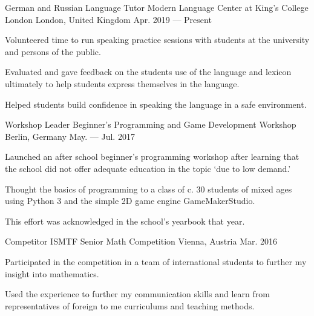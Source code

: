 \begin{cventries}
  \cventry
  {German and Russian Language Tutor} %
  {Modern Language Center at King’s College London} %
  {London, United Kingdom} %
  {Apr. 2019 --- Present} %
  {
    \begin{cvitems} %
      \item {Volunteered time to run speaking practice sessions with students at the university and persons of the public.}
      \item {Evaluated and gave feedback on the students use of the language and lexicon ultimately to help students express themselves in the language.}
      \item {Helped students build confidence in speaking the language in a safe environment.}
    \end{cvitems}
  }

  \cventry
  {Workshop Leader} %
  {Beginner's Programming and Game Development Workshop} %
  {Berlin, Germany} %
  {May. --- Jul. 2017} %
  {
    \begin{cvitems} %
      \item {Launched an after school beginner’s programming workshop after learning that the school did not offer adequate education in the topic `due to low demand.'}
      \item {Thought the basics of programming to a class of c. 30 students of mixed ages using Python 3 and the simple 2D game engine GameMakerStudio.}
      \item {This effort was acknowledged in the school’s yearbook that year.}
    \end{cvitems}
  }

  \cventry
  {Competitor} %
  {ISMTF Senior Math Competition} %
  {Vienna, Austria} %
  {Mar. 2016} %
  {
    \begin{cvitems} %
      \item {Participated in the competition in a team of international students to further my insight into mathematics.}
      \item {Used the experience to further my communication skills and learn from representatives of foreign to me curriculums and teaching methods.}
    \end{cvitems}
  }


\end{cventries}
